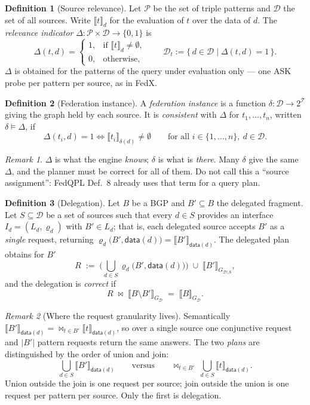 \documentclass[11pt,a4paper]{article}
\theoremstyle{definition}
\newtheorem{definition}{Definition}
\theoremstyle{plain}
\theoremstyle{remark}
\newtheorem*{remark}{Remark}
\newcommand{\Dd}{\mathcal{D}}
\newcommand{\Tt}{\mathcal{T}}
\newcommand{\dataf}{\mathsf{data}}
\newcommand{\ev}[2]{\llbracket #1 \rrbracket_{#2}}
\begin{document}
\begin{definition}[Source relevance]
Let $\mathcal{P}$ be the set of triple patterns and $\Dd$ the set of all sources. Write
$\ev{t}{d}$ for the evaluation of $t$ over the data of $d$. The \emph{relevance
indicator} $\Delta : \mathcal{P} \times \Dd \to \{0,1\}$ is
\[
  \Delta(t,d) =
  \begin{cases}
    1, & \text{if } \ev{t}{d} \neq \emptyset,\\[2pt]
    0, & \text{otherwise,}
  \end{cases}
  \qquad
  \Dd_t := \{\, d \in \Dd \mid \Delta(t,d) = 1 \,\}.
\]
$\Delta$ is obtained for the patterns of the query under evaluation only --- one
\textsf{ASK} probe per pattern per source, as in FedX.
\end{definition}

\begin{definition}[Federation instance]
A \emph{federation instance} is a function $\delta : \Dd \to 2^{\Tt}$ giving the graph
held by each source. It is \emph{consistent} with $\Delta$ for $t_1,\dots,t_n$, written
$\delta \models \Delta$, if
\[
  \Delta(t_i,d) = 1 \iff \ev{t_i}{\delta(d)} \neq \emptyset
  \qquad \text{for all } i \in \{1,\dots,n\},\ d \in \Dd .
\]
\end{definition}

\begin{remark}
$\Delta$ is what the engine \emph{knows}; $\delta$ is what is \emph{there}. Many $\delta$
give the same $\Delta$, and the planner must be correct for all of them. Do not call this
a ``source assignment'': FedQPL Def.~8 already uses that term for a query plan.
\end{remark}

\begin{definition}[Delegation]
\label{def:delegation}
Let $B$ be a BGP and $B' \subseteq B$ the delegated fragment. Let $S \subseteq \Dd$ be a
set of sources such that every $d \in S$ provides an interface $I_d = (L_d, \varrho_d)$
with $B' \in L_d$; that is, each delegated source accepts $B'$ as a \emph{single}
request, returning $\varrho_d\big(B',\dataf(d)\big) = \ev{B'}{\dataf(d)}$. The delegated
plan obtains for $B'$
\[
  R \;:=\; \Big( \bigcup_{d \in S} \varrho_d\big(B', \dataf(d)\big) \Big)
           \;\cup\; \ev{B'}{G_{\Dd \setminus S}},
\]
and the delegation is \emph{correct} if
\[
  R \;\bowtie\; \ev{B \setminus B'}{G_{\Dd}} \;=\; \ev{B}{G_{\Dd}} .
\]
\end{definition}

\begin{remark}[Where the request granularity lives]
Semantically $\ev{B'}{\dataf(d)} = \bowtie_{t \in B'} \ev{t}{\dataf(d)}$, so over a
single source one conjunctive request and $|B'|$ pattern requests return the same
answers. The two \emph{plans} are distinguished by the order of union and join:
\[
  \bigcup_{d \in S} \ev{B'}{\dataf(d)}
  \qquad\text{versus}\qquad
  \bowtie_{t \in B'} \ \bigcup_{d \in S} \ev{t}{\dataf(d)} .
\]
Union outside the join is one request per source; join outside the union is one request
per pattern per source. Only the first is delegation.
\end{remark}
\end{document}
